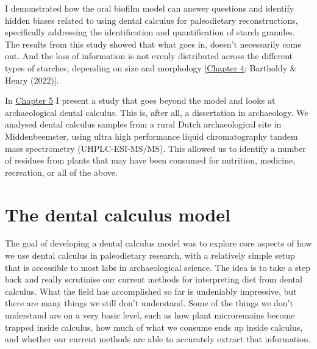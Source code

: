 \documentclass[
  letterpaper,
]{book}
\begin{document}
I demonstrated how the oral biofilm model can answer questions and
identify hidden biases related to using dental calculus for paleodietary
reconstructions, specifically addressing the identification and
quantification of starch granules. The results from this study showed
that what goes in, doesn't necessarily come out. And the loss of
information is not evenly distributed across the different types of
starches, depending on size and morphology
{[}\protect\hyperlink{byoc-starch}{Chapter 4}; Bartholdy \& Henry
(2022){]}.

In \protect\hyperlink{mb11CalculusPilot}{Chapter 5} I present a study
that goes beyond the model and looks at archaeological dental calculus.
This is, after all, a dissertation in archaeology. We analysed dental
calculus samples from a rural Dutch archaeological site in
Middenbeemster, using ultra high performance liquid chromatography
tandem mass spectrometry (UHPLC-ESI-MS/MS). This allowed us to identify
a number of residues from plants that may have been consumed for
nutrition, medicine, recreation, or all of the above.

\hypertarget{the-dental-calculus-model}{%
\section{The dental calculus model}\label{the-dental-calculus-model}}

The goal of developing a dental calculus model was to explore core
aspects of how we use dental calculus in paleodietary research, with a
relatively simple setup that is accessible to most labs in
archaeological science. The idea is to take a step back and really
scrutinise our current methods for interpreting diet from dental
calculus. What the field has accomplished so far is undeniably
impressive, but there are many things we still don't understand. Some of
the things we don't understand are on a very basic level, such as how
plant microremains become trapped inside calculus, how much of what we
consume ends up inside calculus, and whether our current methods are
able to accurately extract that information.
\end{document}
